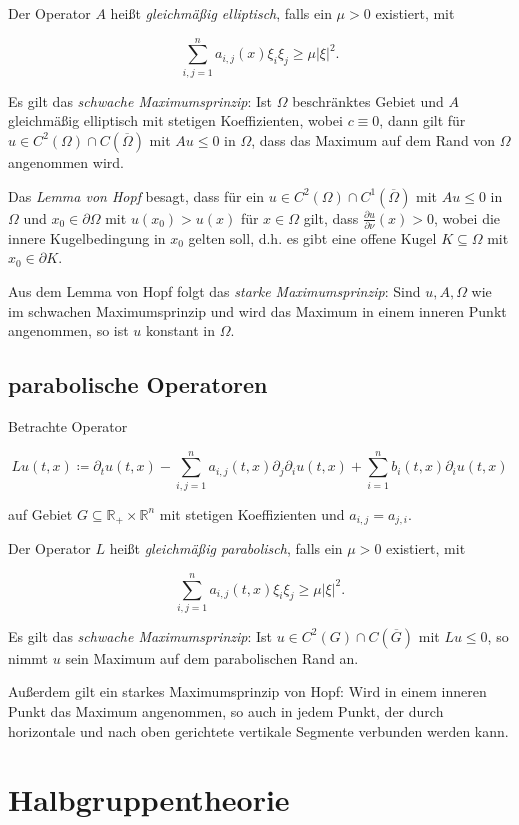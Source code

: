 \documentclass[11pt,a4paper]{scrartcl}
\newcommand{\R}{\mathbb{R}} %
\theoremstyle{plain}
\theoremstyle{definition}
\theoremstyle{remark}
\begin{document}
Der Operator $A$ heißt \emph{gleichmäßig elliptisch}, falls ein $\mu > 0$ existiert, mit

$$\sum_{i,j=1}^n a_{i,j}(x)\xi_i\xi_j \geq \mu |\xi|^2.$$

Es gilt das \emph{schwache Maximumsprinzip}: Ist $\Omega$ beschränktes Gebiet und $A$ gleichmäßig elliptisch mit stetigen Koeffizienten, wobei $c\equiv 0$, dann gilt für $u\in C^2(\Omega) \cap C(\overline{\Omega})$ mit $Au \leq 0$ in $\Omega$, dass das Maximum auf dem Rand von $\Omega$ angenommen wird.

Das \emph{Lemma von Hopf} besagt, dass für ein $u\in C^2(\Omega) \cap C^1(\overline{\Omega})$ mit $Au\leq 0$ in $\Omega$ und $x_0\in \partial\Omega$ mit $u(x_0) > u(x)$ für $x\in \Omega$ gilt, dass $\frac{\partial u}{\partial \nu}(x) > 0$, wobei die innere Kugelbedingung in $x_0$ gelten soll, d.h. es gibt eine offene Kugel $K\subseteq \Omega$ mit $x_0 \in \partial K$.

Aus dem Lemma von Hopf folgt das \emph{starke Maximumsprinzip}: Sind $u,A,\Omega$ wie im schwachen Maximumsprinzip und wird das Maximum in einem inneren Punkt angenommen, so ist $u$ konstant in $\Omega$.

\subsection{parabolische Operatoren}

Betrachte Operator

$$Lu(t,x)\coloneqq \partial_t u(t,x) -\sum_{i,j=1}^n a_{i,j}(t,x)\partial_j \partial_i u(t,x) + \sum_{i=1}^n b_i(t,x) \partial_i u(t,x)$$

auf Gebiet $G\subseteq \R_+ \times \R^n$ mit stetigen Koeffizienten und $a_{i,j}=a_{j,i}$.

Der Operator $L$ heißt \emph{gleichmäßig parabolisch}, falls ein $\mu > 0$ existiert, mit

$$\sum_{i,j=1}^n a_{i,j}(t,x)\xi_i\xi_j \geq \mu |\xi|^2.$$

Es gilt das \emph{schwache Maximumsprinzip}: Ist $u\in C^2(G) \cap C(\overline{G})$ mit $Lu \leq 0$, so nimmt $u$ sein Maximum auf dem parabolischen Rand an.

Außerdem gilt ein starkes Maximumsprinzip von Hopf: Wird in einem inneren Punkt das Maximum angenommen, so auch in jedem Punkt, der durch horizontale und nach oben gerichtete vertikale Segmente verbunden werden kann.

\section{Halbgruppentheorie}
\end{document}
